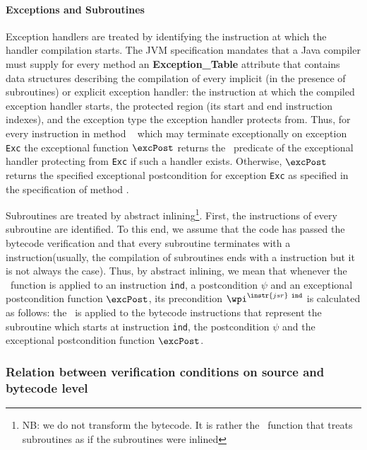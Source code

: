 \paragraph*{Exceptions and Subroutines}
Exception handlers are treated by identifying the instruction at which the handler compilation starts. The JVM specification mandates 
that a Java compiler must supply for every method an \textbf{Exception\_Table} attribute that contains data structures describing the compilation of every implicit (in the presence of subroutines) or explicit exception handler: the instruction at which the compiled exception handler starts,
 the protected region (its start and end instruction indexes), and the exception type the exception handler protects from. Thus, 
for every instruction  in method \method~ which may terminate exceptionally on exception \texttt{Exc} the exceptional function
 $\excPost$  returns the \wpi \ predicate of the exceptional handler protecting  from \texttt{Exc} if such a handler exists.
Otherwise, $\excPost$ returns the specified exceptional postcondition for exception \texttt{Exc} as specified in the specification of
method \method.

Subroutines are treated by abstract inlining\footnote{NB: we do not transform the bytecode. It is rather the \wpi \
 function that treats subroutines as if the subroutines were inlined}. First, the instructions of every subroutine
 are identified. 
To this end, we assume that the code has passed the bytecode verification and that every subroutine terminates with a  
instruction(usually, the compilation of subroutines ends with a \instr{ret} instruction but it is not always the case). Thus, by abstract inlining, we mean that
 whenever the \wpi~function is applied to an instruction \instr{jsr}  \texttt{ind}, a postcondition $\psi$ and an exceptional postcondition function $\excPost$, its precondition  $\wpi^{\instr{jsr} \ \tt{ind}}$ is calculated as follows: the \wpi \ is applied to the bytecode instructions that represent the subroutine which starts at instruction \texttt{ind},
 the postcondition $\psi$ and the exceptional postcondition function  $\excPost$.





 \subsubsection{Relation between verification conditions on source and
 bytecode level } \label{pogEquiv} 

